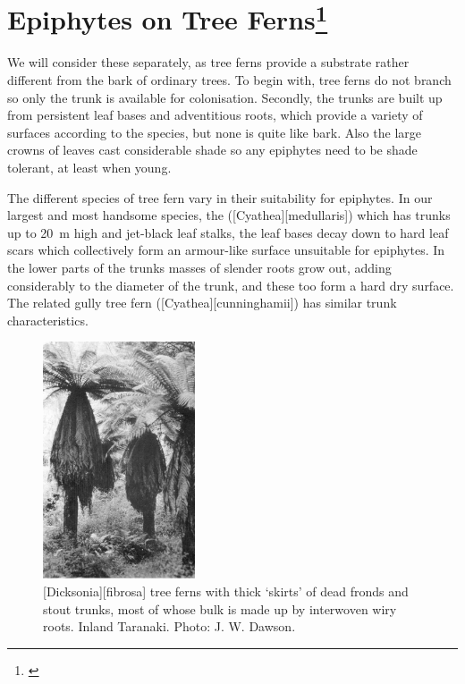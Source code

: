 \section[Epiphytes on Tree Ferns]{Epiphytes on Tree Ferns\thinspace\footnote{\cite{pope1924role}}}

We will consider these separately, as tree ferns provide a substrate rather different from the bark of ordinary trees.
To begin with, tree ferns do not branch so only the trunk is available for colonisation.
Secondly, the trunks are built up from persistent leaf bases and adventitious roots, which provide a variety of surfaces according to the species, but none is quite like bark.
Also the large crowns of leaves cast considerable shade so any epiphytes need to be shade tolerant, at least when young.

The different species of tree fern vary in their suitability for epiphytes.
In our largest and most handsome species, the  ([Cyathea][medullaris]) which has trunks up to \SI{20}{\metre} high and jet-black leaf stalks, the leaf bases decay down to hard leaf scars which collectively form an armour-like surface unsuitable for epiphytes.
In the lower parts of the trunks masses of slender roots grow out, adding considerably to the diameter of the trunk, and these too form a hard dry surface.
The related gully tree fern ([Cyathea][cunninghamii]) has similar trunk characteristics.

\begin{figure}
	\includegraphics[width=0.4\textwidth]{graphics/figure54dicksonia-fibrosa.jpg}
	\centering
	\caption[\emph{Dicksonia fibrosa} tree ferns with thick `skirts' of dead fronds and stout trunks]{[Dicksonia][fibrosa] tree ferns with thick `skirts' of dead fronds and stout trunks, most of whose bulk is made up by interwoven wiry roots.
Inland Taranaki.
	Photo: J. W. Dawson.}%
	\label{fig:54dicksonia-fibrosa}
\end{figure}

